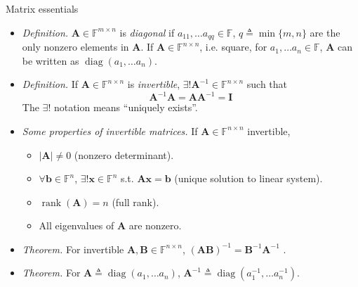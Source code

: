 \documentclass{beamer}
\numberwithin{equation}{section}
\begin{document}
\begin{frame}{Matrix essentials}
    \begin{itemize}
        \item
        \textit{Definition.} $ \mathbf{A} \in \mathbb{F}^{m \times n} $
        is \textit{diagonal} if $ a_{11}, \ldots a_{qq}  \in \mathbb{F} $,
        $ q \triangleq \min\{m, n\} $ are the only nonzero elements in
        $ \mathbf{A} $. If $ \mathbf{A} \in \mathbb{F}^{n \times n} $, i.e.
        square, for $ a_1, \ldots a_n \in \mathbb{F} $, $ \mathbf{A} $ can
        be written as $ \operatorname{diag}(a_1, \ldots a_n) $.
        
        \item
        \textit{Definition.} If $ \mathbf{A} \in \mathbb{F}^{n \times n} $ is
        \textit{invertible}, $ \exists! \mathbf{A}^{-1} \in
        \mathbb{F}^{n \times n} $ such that
        \begin{equation*}
            \mathbf{A}^{-1}\mathbf{A} = \mathbf{AA}^{-1} = \mathbf{I}
        \end{equation*}
        The $ \exists! $ notation means ``uniquely exists''.

        \item
        \textit{
            Some properties of invertible matrices\footnotemark{}.
        } If $ \mathbf{A} \in
        \mathbb{F}^{n \times n} $ invertible,
        \begin{itemize}
            \item
            $ |\mathbf{A}| \ne 0 $ (nonzero determinant).

            \item
            $ \forall \mathbf{b} \in \mathbb{F}^n $, $ \exists! \mathbf{x} \in
            \mathbb{F}^n $ s.t. $ \mathbf{Ax} = \mathbf{b} $ (unique solution
            to linear system).

            \item
            $ \operatorname{rank}(\mathbf{A}) = n $ (full rank).

            \item
            All eigenvalues of $ \mathbf{A} $ are nonzero.
        \end{itemize}

        \item
        \textit{Theorem.} For invertible $ \mathbf{A}, \mathbf{B} \in
        \mathbb{F}^{n \times n} $, $ (\mathbf{AB})^{-1} =
        \mathbf{B}^{-1}\mathbf{A}^{-1} $ \cite{jacob_linalg}.

        \item
        \textit{Theorem.} For $ \mathbf{A} \triangleq
        \operatorname{diag}(a_1, \ldots a_n) $, $ \mathbf{A}^{-1} \triangleq
        \operatorname{diag}\left(a_1^{-1}, \ldots a_n^{-1}\right) $.
    \end{itemize}

    \medskip
\end{frame}
\end{document}
